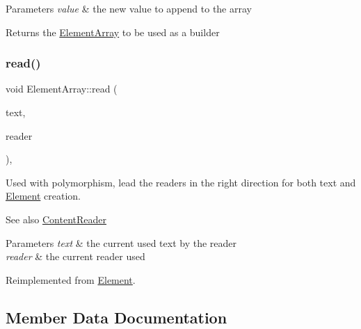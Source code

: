 \begin{DoxyParams}{Parameters}
{\em value} & the new value to append to the array \\
\hline
\end{DoxyParams}
\begin{DoxyReturn}{Returns}
the \mbox{\hyperlink{classElementArray}{Element\+Array}} to be used as a builder 
\end{DoxyReturn}
\mbox{\label{classElementArray_a5353c82d5c132acdad69858884e3e334}} 
\subsubsection{\texorpdfstring{read()}{read()}}
{\footnotesize\ttfamily void Element\+Array\+::read (\begin{DoxyParamCaption}\item[{std\+::string \&}]{text,  }\item[{const \mbox{\hyperlink{classContentReader}{Content\+Reader}} $\ast$}]{reader }\end{DoxyParamCaption})\hspace{0.3cm}{\ttfamily [override]}, {\ttfamily [virtual]}}

Used with polymorphism, lead the readers in the right direction for both text and \mbox{\hyperlink{classElement}{Element}} creation. \begin{DoxySeeAlso}{See also}
\mbox{\hyperlink{classContentReader}{Content\+Reader}}
\end{DoxySeeAlso}

\begin{DoxyParams}{Parameters}
{\em text} & the current used text by the reader \\
\hline
{\em reader} & the current reader used \\
\hline
\end{DoxyParams}


Reimplemented from \mbox{\hyperlink{classElement_ab468bd37a9558f5227837a9236bc9e4b}{Element}}.



\subsection{Member Data Documentation}
\mbox{\label{classElementArray_a3d0a8546daca882d59f55413a338be87}} 
